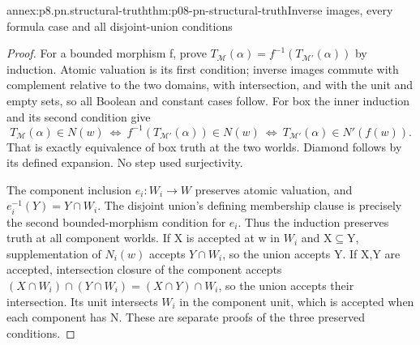 \begin{annexitem}{annex:p8.pn.structural-truth}{thm:p08-pn-structural-truth}{Inverse images, every formula case and all disjoint-union conditions}
\begin{proof}
For a bounded morphism f, prove
\(T_{\mathcal M}(\alpha)=f^{-1}(T_{\mathcal M'}(\alpha))\)
by induction. Atomic valuation is its first condition; inverse
images commute with complement relative to the two domains,
with intersection, and with the unit and empty sets, so all
Boolean and constant cases follow. For box the inner induction
and its second condition give
\[
 T_{\mathcal M}(\alpha)\in N(w)
 \ \Longleftrightarrow\ f^{-1}(T_{\mathcal M'}(\alpha))\in N(w)
 \ \Longleftrightarrow\ T_{\mathcal M'}(\alpha)\in N'(f(w)).
\]
That is exactly equivalence of box truth at the two worlds.
Diamond follows by its defined expansion. No step used surjectivity.

The component inclusion \(e_i:W_i\to W\) preserves atomic
valuation, and \(e_i^{-1}(Y)=Y\cap W_i\). The disjoint
union's defining membership clause is precisely the second
bounded-morphism condition for \(e_i\). Thus the induction
preserves truth at all component worlds. If X is accepted at
w in \(W_i\) and X\(\subseteq\)Y, supplementation of
\(N_i(w)\) accepts \(Y\cap W_i\), so the union accepts Y.
If X,Y are accepted, intersection closure of the component
accepts \((X\cap W_i)\cap(Y\cap W_i)
=(X\cap Y)\cap W_i\), so the union accepts their intersection.
Its unit intersects \(W_i\) in the component unit, which is
accepted when each component has N. These are separate proofs
of the three preserved conditions.
\end{proof}
\end{annexitem}

